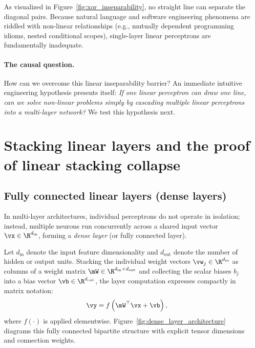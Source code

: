\documentclass[../../main.tex]{subfiles}
\begin{document}
As visualized in Figure~\ref{fig:xor_inseparability}, no straight line can separate the diagonal pairs. Because natural language and software engineering phenomena are riddled with non-linear relationships (e.g., mutually dependent programming idioms, nested conditional scopes), single-layer linear perceptrons are fundamentally inadequate.

\paragraph{The causal question.}
How can we overcome this linear inseparability barrier? An immediate intuitive engineering hypothesis presents itself: \emph{If one linear perceptron can draw one line, can we solve non-linear problems simply by cascading multiple linear perceptrons into a multi-layer network?} We test this hypothesis next.


\section{Stacking linear layers and the proof of linear stacking collapse}
\label{sec:linear_stacking_collapse}

\subsection{Fully connected linear layers (dense layers)}
In multi-layer architectures, individual perceptrons do not operate in isolation; instead, multiple neurons run concurrently across a shared input vector $\vx \in \R^{d_{\text{in}}}$, forming a \emph{dense layer} (or fully connected layer).

Let $d_{\text{in}}$ denote the input feature dimensionality and $d_{\text{out}}$ denote the number of hidden or output units. Stacking the individual weight vectors $\vw_j \in \R^{d_{\text{in}}}$ as columns of a weight matrix $\mW \in \R^{d_{\text{in}} \times d_{\text{out}}}$ and collecting the scalar biases $b_j$ into a bias vector $\vb \in \R^{d_{\text{out}}}$, the layer computation expresses compactly in matrix notation:
\begin{equation}
\label{eq:dense_matrix_layer}
\vy = f\left( \mW^\top \vx + \vb \right),
\end{equation}
where $f(\cdot)$ is applied elementwise. Figure~\ref{fig:dense_layer_architecture} diagrams this fully connected bipartite structure with explicit tensor dimensions and connection weights.
\end{document}
